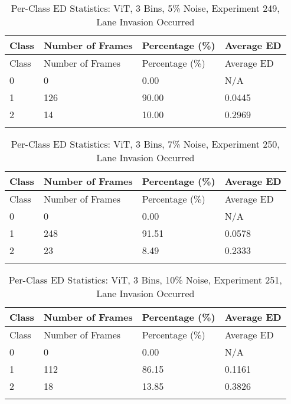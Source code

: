 
\begin{longtable}{@{}llll@{}}
\toprule
Class & Number of Frames & Percentage (\%) & Average ED \\
\midrule
\endfirsthead
\toprule
Class & Number of Frames & Percentage (\%) & Average ED \\
\midrule
\endhead
0 & 0 & 0.00 & N/A \\
1 & 126 & 90.00 & 0.0445 \\
2 & 14 & 10.00 & 0.2969 \\
\bottomrule
\caption{Per-Class ED Statistics: ViT, 3 Bins, 5\% Noise, Experiment 249, Lane Invasion Occurred}
\label{tab:exp249_ViT_3bins_5noise}
\end{longtable}
        


\begin{longtable}{@{}llll@{}}
\toprule
Class & Number of Frames & Percentage (\%) & Average ED \\
\midrule
\endfirsthead
\toprule
Class & Number of Frames & Percentage (\%) & Average ED \\
\midrule
\endhead
0 & 0 & 0.00 & N/A \\
1 & 248 & 91.51 & 0.0578 \\
2 & 23 & 8.49 & 0.2333 \\
\bottomrule
\caption{Per-Class ED Statistics: ViT, 3 Bins, 7\% Noise, Experiment 250, Lane Invasion Occurred}
\label{tab:exp250_ViT_3bins_7noise}
\end{longtable}
        


\begin{longtable}{@{}llll@{}}
\toprule
Class & Number of Frames & Percentage (\%) & Average ED \\
\midrule
\endfirsthead
\toprule
Class & Number of Frames & Percentage (\%) & Average ED \\
\midrule
\endhead
0 & 0 & 0.00 & N/A \\
1 & 112 & 86.15 & 0.1161 \\
2 & 18 & 13.85 & 0.3826 \\
\bottomrule
\caption{Per-Class ED Statistics: ViT, 3 Bins, 10\% Noise, Experiment 251, Lane Invasion Occurred}
\label{tab:exp251_ViT_3bins_10noise}
\end{longtable}
        

